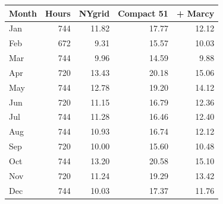 \begin{tabular}{lrrrr}
\toprule
Month & Hours & NYgrid & Compact 51 & + Marcy \\
\midrule
Jan & 744 & 11.82 & 17.77 & 12.12 \\
Feb & 672 & 9.31 & 15.57 & 10.03 \\
Mar & 744 & 9.96 & 14.59 & 9.88 \\
Apr & 720 & 13.43 & 20.18 & 15.06 \\
May & 744 & 12.78 & 19.20 & 14.12 \\
Jun & 720 & 11.15 & 16.79 & 12.36 \\
Jul & 744 & 11.28 & 16.46 & 12.40 \\
Aug & 744 & 10.93 & 16.74 & 12.12 \\
Sep & 720 & 10.00 & 15.60 & 10.48 \\
Oct & 744 & 13.20 & 20.58 & 15.10 \\
Nov & 720 & 11.24 & 19.29 & 13.42 \\
Dec & 744 & 10.03 & 17.37 & 11.76 \\
\bottomrule
\end{tabular}
